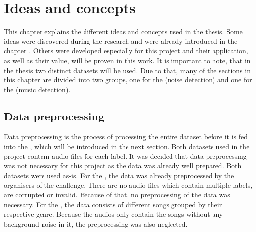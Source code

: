 \chapter{Ideas and concepts}
\label{ch:Ideas-Concepts}

This chapter explains the different ideas and concepts used in the thesis. Some ideas were discovered during the research and were already introduced in the chapter . Others were developed especially for this project and their application, as well as their value, will be proven in this work.
\newline
\newline
It is important to note, that in the thesis two distinct datasets will be used. Due to that, many of the sections in this chapter are divided into two groups, one for the  (noise detection) and one for the  (music detection).

\section{Data preprocessing}
\label{sec:Data-Preprocessing}
Data preprocessing is the process of processing the entire dataset before it is fed into the , which will be introduced in the next section. Both datasets used in the project contain audio files for each label. It was decided that data preprocessing was not necessary for this project as the data was already well prepared. Both datasets were used as-is.
\newline
\newline
For the , the data was already preprocessed by the organisers of the challenge. There are no audio files which contain multiple labels, are corrupted or invalid. Because of that, no preprocessing of the data was necessary.
\newline
\newline
For the , the data consists of different songs grouped by their respective genre. Because the audios only contain the songs without any background noise in it, the preprocessing was also neglected.

